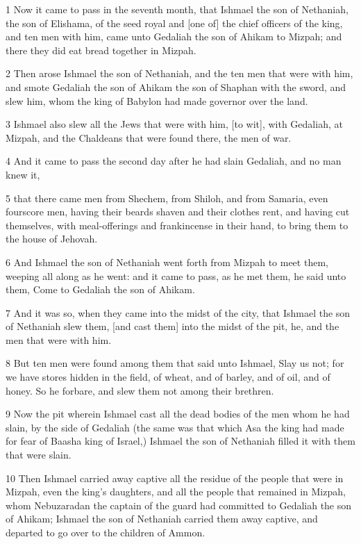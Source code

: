 \par 1 Now it came to pass in the seventh month, that Ishmael the son of Nethaniah, the son of Elishama, of the seed royal and [one of] the chief officers of the king, and ten men with him, came unto Gedaliah the son of Ahikam to Mizpah; and there they did eat bread together in Mizpah.
\par 2 Then arose Ishmael the son of Nethaniah, and the ten men that were with him, and smote Gedaliah the son of Ahikam the son of Shaphan with the sword, and slew him, whom the king of Babylon had made governor over the land.
\par 3 Ishmael also slew all the Jews that were with him, [to wit], with Gedaliah, at Mizpah, and the Chaldeans that were found there, the men of war.
\par 4 And it came to pass the second day after he had slain Gedaliah, and no man knew it,
\par 5 that there came men from Shechem, from Shiloh, and from Samaria, even fourscore men, having their beards shaven and their clothes rent, and having cut themselves, with meal-offerings and frankincense in their hand, to bring them to the house of Jehovah.
\par 6 And Ishmael the son of Nethaniah went forth from Mizpah to meet them, weeping all along as he went: and it came to pass, as he met them, he said unto them, Come to Gedaliah the son of Ahikam.
\par 7 And it was so, when they came into the midst of the city, that Ishmael the son of Nethaniah slew them, [and cast them] into the midst of the pit, he, and the men that were with him.
\par 8 But ten men were found among them that said unto Ishmael, Slay us not; for we have stores hidden in the field, of wheat, and of barley, and of oil, and of honey. So he forbare, and slew them not among their brethren.
\par 9 Now the pit wherein Ishmael cast all the dead bodies of the men whom he had slain, by the side of Gedaliah (the same was that which Asa the king had made for fear of Baasha king of Israel,) Ishmael the son of Nethaniah filled it with them that were slain.
\par 10 Then Ishmael carried away captive all the residue of the people that were in Mizpah, even the king's daughters, and all the people that remained in Mizpah, whom Nebuzaradan the captain of the guard had committed to Gedaliah the son of Ahikam; Ishmael the son of Nethaniah carried them away captive, and departed to go over to the children of Ammon.
